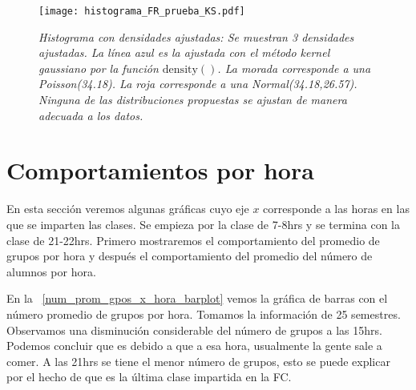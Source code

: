 
\begin{figure}[H]
\centering
\texttt{[image: histograma\_FR\_prueba\_KS.pdf]} %
\caption[\textit{Histograma con densidades ajustadas}]{\textit{Histograma con densidades ajustadas: Se muestran 3 densidades ajustadas. La línea azul es la ajustada con el método kernel gaussiano por la función $\mathrm{density()}$. La morada corresponde a una Poisson(34.18). La roja corresponde a una Normal(34.18,26.57). Ninguna de las distribuciones propuestas se ajustan de manera adecuada a los datos.}}\label{histFR_pruebaKS}
\end{figure}



\section{Comportamientos por hora}

En esta sección veremos algunas gráficas cuyo eje $x$ corresponde a las horas en las que se imparten las clases. Se empieza por la clase de 7-8hrs y se termina con la clase de 21-22hrs. Primero mostraremos el comportamiento del promedio de grupos por hora y después el comportamiento del promedio del número de alumnos por hora.

En la \figurename{~\ref{num_prom_gpos_x_hora_barplot}} vemos la gráfica de barras con el número promedio de grupos por hora. Tomamos la información de 25 semestres. Observamos una disminución considerable del número de grupos a las 15hrs. Podemos concluir que es debido a que a esa hora, usualmente la gente sale a comer. A las 21hrs se tiene el menor número de grupos, esto se puede explicar por el hecho de que es la última clase impartida en la FC.

